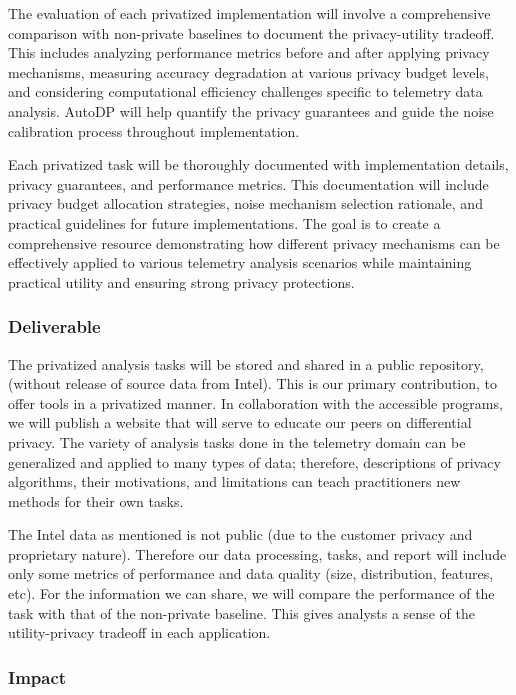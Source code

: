 \documentclass[12pt,letterpaper]{article}
\begin{document}
The evaluation of each privatized implementation will involve a comprehensive comparison with non-private baselines to document the privacy-utility tradeoff. This includes analyzing performance metrics before and after applying privacy mechanisms, measuring accuracy degradation at various privacy budget levels, and considering computational efficiency challenges specific to telemetry data analysis. AutoDP will help quantify the privacy guarantees and guide the noise calibration process throughout implementation. 

Each privatized task will be thoroughly documented with implementation details, privacy guarantees, and performance metrics. This documentation will include privacy budget allocation strategies, noise mechanism selection rationale, and practical guidelines for future implementations. The goal is to create a comprehensive resource demonstrating how different privacy mechanisms can be effectively applied to various telemetry analysis scenarios while maintaining practical utility and ensuring strong privacy protections.


\subsubsection{Deliverable}

The privatized analysis tasks will be stored and shared in a public repository, (without release of source data from Intel). This is our primary contribution, to offer tools in a privatized manner. In collaboration with the accessible programs, we will publish a website that will serve to educate our peers on differential privacy. The variety of analysis tasks done in the telemetry domain can be generalized and applied to many types of data; therefore, descriptions of privacy algorithms, their motivations, and limitations can teach practitioners new methods for their own tasks. 

The Intel data as mentioned is not public (due to the customer privacy and proprietary nature). Therefore our data processing, tasks, and report will include only some metrics of performance and data quality (size, distribution, features, etc). For the information we can share, we will compare the performance of the task with that of the non-private baseline. This gives analysts a sense of the utility-privacy tradeoff in each application. 

\subsubsection{Impact}
\end{document}
